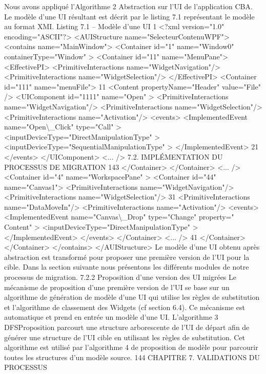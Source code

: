 \documentclass{article}
\begin{document}
Nous avons appliqu\'{e} l’Algorithme 2 Abstraction sur l’UI de l’application CBA. Le mod\`{e}le d’une
UI r\'{e}sultant est d\'{e}crit par le listing 7.1 repr\'{e}sentant le mod\`{e}le au format XMI.
Listing 7.1 – Mod\`{e}le d’une UI
1 <?xml version="1.0" encoding="ASCII"?>
<AUIStructure name="SelecteurContenuWPF">
<contains name="MainWindow">
<Container id="1" name="Window0" containerType="Window" >
<Container id="11" name="MenuPane">
<EffectivePI>
<PrimitiveInteractions name="WidgetNavigation"/>
<PrimitiveInteractions name="WidgetSelection"/>
</EffectivePI>
<Container id="111" name="menuFile">
11
<Content propertyName="Header" value="File" />
<UIComponent id="1111" name="Open" >
<PrimitiveInteractions name="WidgetNavigation"/>
<PrimitiveInteractions name="WidgetSelection"/>
<PrimitiveInteractions name="Activation"/>
<events>
<ImplementedEvent name="Open\textbackslash{}_Click" type="Call" >
<inputDeviceType="DirectManipulationType" >
<inputDeviceType="SequentialManipulationType" >
</ImplementedEvent>
21
</events>
</UIComponent>
<... />
7.2. IMPLÉMENTATION DU PROCESSUS DE MIGRATION
143
</Container>
</Container>
<... />
<Container id="4" name="WorkspacePane" >
<Container id="44" name="Canvas1">
<PrimitiveInteractions name="WidgetNavigation"/>
<PrimitiveInteractions name="WidgetSelection"/>
31
<PrimitiveInteractions name="DataMoveIn"/>
<PrimitiveInteractions name="Activation"/>
<events>
<ImplementedEvent name="Canvas\textbackslash{}_Drop" type="Change" property="
Content" >
<inputDeviceType="DirectManipulationType" >
</ImplementedEvent>
</events>
</Container>
<... />
41
</Container>
</Container>
</contains>
</AUIStructure>
Le mod\`{e}le d’une UI obtenu apr\`{e}s abstraction est transform\'{e} pour proposer une premi\`{e}re version de
l’UI pour la cible. Dans la section suivante nous pr\'{e}sentons les diff\'{e}rents modules de notre processus
de migration.
7.2.2
Proposition d’une version des UI migr\'{e}es
Le m\'{e}canisme de proposition d’une premi\`{e}re version de l’UI se base sur un algorithme de g\'{e}n\'{e}ration de mod\`{e}le d’une UI qui utilise les r\`{e}gles de substitution et l’algorithme de classement des
Widgets (cf section 6.4). Ce m\'{e}canisme est automatique et prend en entr\'{e}e un mod\`{e}le d’une UI.
L’algorithme 3 DFSProposition parcourt une structure arborescente de l’UI de d\'{e}part aﬁn de g\'{e}n\'{e}rer une structure de l’UI cible en utilisant les r\`{e}gles de substitution. Cet algorithme est utilis\'{e} par
l’algorithme 4 de proposition de mod\`{e}le pour parcourir toutes les structures d’un mod\`{e}le source.
144
CHAPITRE 7. VALIDATIONS DU PROCESSUS
\end{document}
